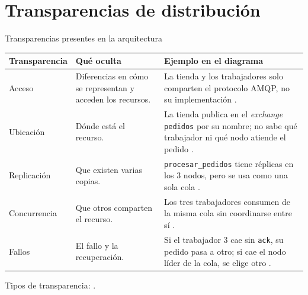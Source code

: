 \section{Transparencias de distribución}

\begin{frame}{Transparencias presentes en la arquitectura}
  \small
  \begin{tabularx}{\textwidth}{@{}p{2.5cm}p{3.5cm}X@{}}
    \toprule
    \textbf{Transparencia} & \textbf{Qué oculta} & \textbf{Ejemplo en el diagrama} \\
    \midrule
    Acceso & \raggedright Diferencias en cómo se representan y acceden los
      recursos. &
      La tienda y los trabajadores solo comparten el protocolo AMQP, no su
      implementación \cite{rabbitmq2026connections}. \\
    Ubicación & \raggedright Dónde está el recurso. &
      La tienda publica en el \textit{exchange} \texttt{pedidos} por su
      nombre; no sabe qué trabajador ni qué nodo atiende el pedido
      \cite{rabbitmq2026amqp,rabbitmq2026clustering}. \\
    Replicación & \raggedright Que existen varias copias. &
      \texttt{procesar\_pedidos} tiene réplicas en los 3 nodos, pero se usa
      como una sola cola \cite{rabbitmq2026quorum}. \\
    Concurrencia & \raggedright Que otros comparten el recurso. &
      Los tres trabajadores consumen de la misma cola sin coordinarse entre
      sí \cite{rabbitmq2026amqp}. \\
    Fallos & \raggedright El fallo y la recuperación. &
      Si el trabajador 3 cae sin \texttt{ack}, su pedido pasa a otro; si cae
      el nodo líder de la cola, se elige otro
      \cite{rabbitmq2026queues,rabbitmq2026quorum}. \\
    \bottomrule
  \end{tabularx}

  \vspace{0.2cm}
  {\tiny Tipos de transparencia: \cite{vansteen2023distributed}.}
\end{frame}

